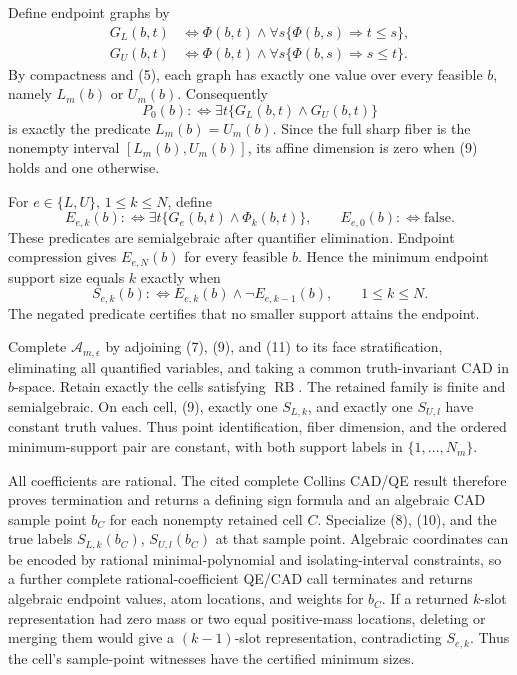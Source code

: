 Define endpoint graphs by
\[
 \begin{split}
 G_L(b,t)&\Longleftrightarrow
 \Phi(b,t)\wedge\forall s\{\Phi(b,s)\Rightarrow t\leq s\},\\
 G_U(b,t)&\Longleftrightarrow
 \Phi(b,t)\wedge\forall s\{\Phi(b,s)\Rightarrow s\leq t\}.
 \end{split}
\tag{8}
\]
By compactness and (5), each graph has exactly one value over every feasible \(b\), namely \(L_m(b)\) or \(U_m(b)\).  Consequently
\[
 P_0(b):\Longleftrightarrow\exists t\{G_L(b,t)\wedge G_U(b,t)\}
\tag{9}
\]
is exactly the predicate \(L_m(b)=U_m(b)\).  Since the full sharp fiber is the nonempty interval \([L_m(b),U_m(b)]\), its affine dimension is zero when (9) holds and one otherwise.

For \(e\in\{L,U\}\), \(1\leq k\leq N\), define
\[
 E_{e,k}(b):\Longleftrightarrow
 \exists t\{G_e(b,t)\wedge\Phi_k(b,t)\},
 \qquad E_{e,0}(b):\Longleftrightarrow\mathrm{false}.
\tag{10}
\]
These predicates are semialgebraic after quantifier elimination.  Endpoint compression gives \(E_{e,N}(b)\) for every feasible \(b\).  Hence the minimum endpoint support size equals \(k\) exactly when
\[
 S_{e,k}(b):\Longleftrightarrow E_{e,k}(b)\wedge\neg E_{e,k-1}(b),
 \qquad 1\leq k\leq N.
\tag{11}
\]
The negated predicate certifies that no smaller support attains the endpoint.

Complete \(\mathcal A_{m,\epsilon}\) by adjoining (7), (9), and (11) to its face stratification, eliminating all quantified variables, and taking a common truth-invariant CAD in \(b\)-space.  Retain exactly the cells satisfying \(\operatorname{RB}\).  The retained family is finite and semialgebraic.  On each cell, (9), exactly one \(S_{L,k}\), and exactly one \(S_{U,l}\) have constant truth values.  Thus point identification, fiber dimension, and the ordered minimum-support pair are constant, with both support labels in \(\{1,\ldots,N_m\}\).

All coefficients are rational.  The cited complete Collins CAD/QE result therefore proves termination and returns a defining sign formula and an algebraic CAD sample point \(b_C\) for each nonempty retained cell \(C\).  Specialize (8), (10), and the true labels \(S_{L,k}(b_C)\), \(S_{U,l}(b_C)\) at that sample point.  Algebraic coordinates can be encoded by rational minimal-polynomial and isolating-interval constraints, so a further complete rational-coefficient QE/CAD call terminates and returns algebraic endpoint values, atom locations, and weights for \(b_C\).  If a returned \(k\)-slot representation had zero mass or two equal positive-mass locations, deleting or merging them would give a \((k-1)\)-slot representation, contradicting \(S_{e,k}\).  Thus the cell's sample-point witnesses have the certified minimum sizes.

